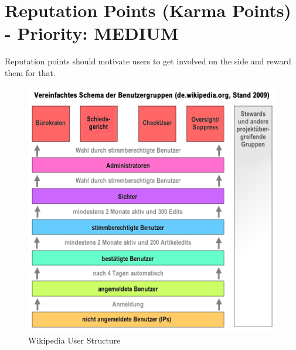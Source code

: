 \section{Reputation Points (Karma Points) - Priority: MEDIUM}
\begin{tcolorbox}[breakable,colback=red!14,colframe=red!40!black,title=UPDATE 30/11/2017]
Reputation points should motivate users to get involved on the side and reward them for that.\\
\end{tcolorbox}
\begin{figure}[!tbp]
  \centering
\begin{minipage}[b]{0.6\textwidth}
    \includegraphics[width=\textwidth]{Pictures/Wikipedia}
    \caption{Wikipedia User Structure}
  \end{minipage}
  \hfill
  \begin{minipage}[b]{0.3\textwidth}

\end{minipage}
\end{figure}
